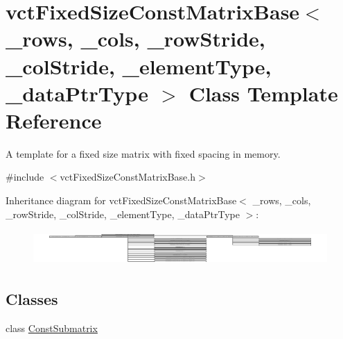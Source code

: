 \hypertarget{classvct_fixed_size_const_matrix_base}{}\section{vct\+Fixed\+Size\+Const\+Matrix\+Base$<$ \+\_\+rows, \+\_\+cols, \+\_\+row\+Stride, \+\_\+col\+Stride, \+\_\+element\+Type, \+\_\+data\+Ptr\+Type $>$ Class Template Reference}
\label{classvct_fixed_size_const_matrix_base}


A template for a fixed size matrix with fixed spacing in memory.  




{\ttfamily \#include $<$vct\+Fixed\+Size\+Const\+Matrix\+Base.\+h$>$}

Inheritance diagram for vct\+Fixed\+Size\+Const\+Matrix\+Base$<$ \+\_\+rows, \+\_\+cols, \+\_\+row\+Stride, \+\_\+col\+Stride, \+\_\+element\+Type, \+\_\+data\+Ptr\+Type $>$\+:\begin{figure}[H]
\begin{center}
\leavevmode
\includegraphics[height=1.325444cm]{d1/d55/classvct_fixed_size_const_matrix_base}
\end{center}
\end{figure}
\subsection*{Classes}
\begin{DoxyCompactItemize}
\item 
class \hyperlink{classvct_fixed_size_const_matrix_base_1_1_const_submatrix}{Const\+Submatrix}
\end{DoxyCompactItemize}
